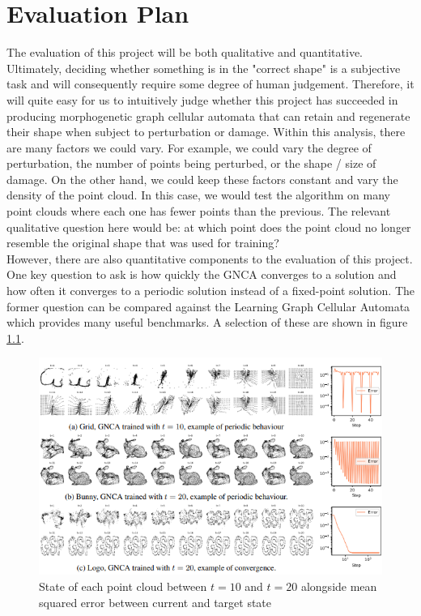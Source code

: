 \chapter{Evaluation Plan}

The evaluation of this project will be both qualitative and quantitative. Ultimately, deciding whether something is in the "correct shape" is a subjective task and will consequently require some degree of human judgement. Therefore, it will quite easy for us to intuitively judge whether this project has succeeded in producing morphogenetic graph cellular automata that can retain and regenerate their shape when subject to perturbation or damage. Within this analysis, there are many factors we could vary. For example, we could vary the degree of perturbation, the number of points being perturbed, or the shape / size of damage. On the other hand, we could keep these factors constant and vary the density of the point cloud. In this case, we would test the algorithm on many point clouds where each one has fewer points than the previous. The relevant qualitative question here would be: at which point does the point cloud no longer resemble the original shape that was used for training? \\

However, there are also quantitative components to the evaluation of this project. One key question to ask is how quickly the GNCA converges to a solution and how often it converges to a periodic solution instead of a fixed-point solution. The former question can be compared against the Learning Graph Cellular Automata \cite{grattarola2021learning} which provides many useful benchmarks. A selection of these are shown in figure \ref{fig:gnca-loss}.

\begin{figure}[!h]
    \centering
    \includegraphics[width=\textwidth]{images/gnca-loss.png}
    \caption{State of each point cloud between $t=10$ and $t=20$ alongside mean squared error between current and target state \cite{grattarola2021learning}}
    \label{fig:gnca-loss}
\end{figure}

